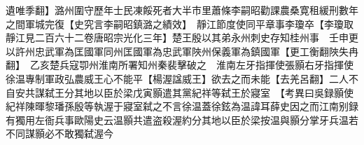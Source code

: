 遺唯季翻】潞州圍守歷年士民凍餒死者大半市里蕭條李嗣昭勸課農桑寛租緩刑數年之間軍城完復【史究言李嗣昭鎮潞之績效】　靜江節度使同平章事李瓊卒【李瓊取靜江見二百六十二卷唐昭宗光化三年】楚王殷以其弟永州刺史存知桂州事　壬申更以許州忠武軍為匡國軍同州匡國軍為忠武軍陜州保義軍為鎮國軍【更工衡翻陜失冉翻】　乙亥楚兵寇卾州淮南所署知州秦裴擊破之　淮南左牙指揮使張顥右牙指揮使徐温專制軍政弘農威王心不能平【楊渥諡威王】欲去之而未能【去羌呂翻】二人不自安共謀弑王分其地以臣於梁戊寅顥遣其黨紀祥等弑王於寢室　【考異曰吳録顥使紀祥陳暉黎璠孫殷等執渥于寢室弑之不言徐温蓋徐鉉為温諱耳薛史因之而江南别録有獨用左衙兵事歐陽史云温顥共遣盗殺渥約分其地以臣於梁按温與顥分掌牙兵温若不同謀顥必不敢獨弑渥今